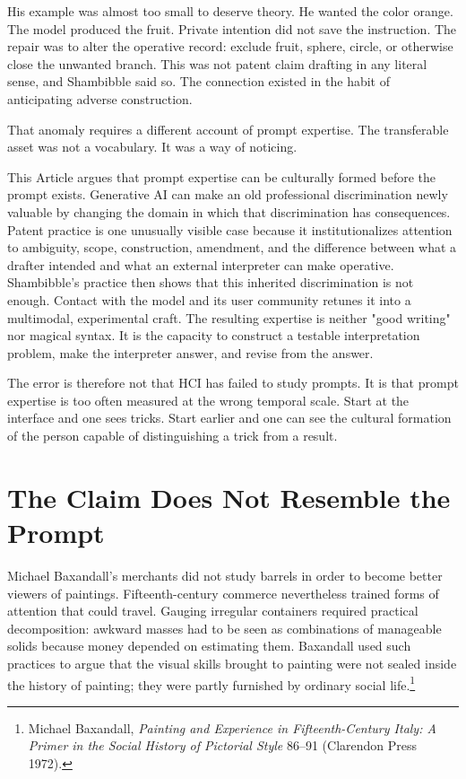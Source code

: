\documentclass[11pt]{article}
\begin{document}
His example was almost too small to deserve theory. He wanted the color orange. The model produced the fruit. Private intention did not save the instruction. The repair was to alter the operative record: exclude fruit, sphere, circle, or otherwise close the unwanted branch. This was not patent claim drafting in any literal sense, and Shambibble said so. The connection existed in the habit of anticipating adverse construction.

That anomaly requires a different account of prompt expertise. The transferable asset was not a vocabulary. It was a way of noticing.

This Article argues that prompt expertise can be culturally formed before the prompt exists. Generative AI can make an old professional discrimination newly valuable by changing the domain in which that discrimination has consequences. Patent practice is one unusually visible case because it institutionalizes attention to ambiguity, scope, construction, amendment, and the difference between what a drafter intended and what an external interpreter can make operative. Shambibble's practice then shows that this inherited discrimination is not enough. Contact with the model and its user community retunes it into a multimodal, experimental craft. The resulting expertise is neither "good writing" nor magical syntax. It is the capacity to construct a testable interpretation problem, make the interpreter answer, and revise from the answer.

The error is therefore not that HCI has failed to study prompts. It is that prompt expertise is too often measured at the wrong temporal scale. Start at the interface and one sees tricks. Start earlier and one can see the cultural formation of the person capable of distinguishing a trick from a result.

\section{The Claim Does Not Resemble the Prompt}

Michael Baxandall's merchants did not study barrels in order to become better viewers of paintings. Fifteenth-century commerce nevertheless trained forms of attention that could travel. Gauging irregular containers required practical decomposition: awkward masses had to be seen as combinations of manageable solids because money depended on estimating them. Baxandall used such practices to argue that the visual skills brought to painting were not sealed inside the history of painting; they were partly furnished by ordinary social life.\footnote{Michael Baxandall, \textit{Painting and Experience in Fifteenth-Century Italy: A Primer in the Social History of Pictorial Style} 86--91 (Clarendon Press 1972).}
\end{document}
